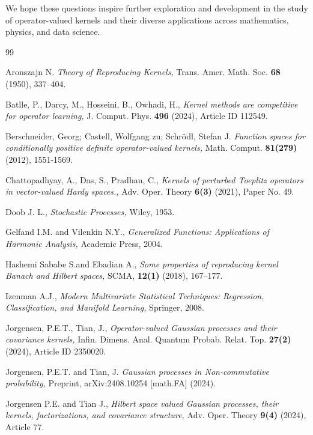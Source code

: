 \documentclass[11pt]{amsart}
\theoremstyle{definition}
\numberwithin{equation}{section}
\begin{document}
We hope these questions inspire further exploration and development in the study of operator-valued kernels and their diverse applications across mathematics, physics, and data science.


\begin{thebibliography}{99}

Aronszajn  N. {\it Theory of Reproducing Kernels,} Trans. Amer. Math. Soc. {\bf 68} (1950), 337--404.

Batlle, P., Darcy, M., Hosseini, B., Owhadi, H., {\it Kernel methods are competitive for operator learning,} J. Comput. Phys. {\bf 496} (2024), Article ID 112549.

Berschneider, Georg; Castell, Wolfgang zu; Schrödl, Stefan J. {\it Function spaces for conditionally positive definite operator-valued kernels,} Math. Comput. {\bf 81(279)} (2012), 1551-1569.

Chattopadhyay, A., Das, S., Pradhan, C., {\it Kernels of perturbed Toeplitz operators in vector-valued Hardy spaces.,} Adv. Oper. Theory {\bf 6(3)} (2021), Paper No. 49.

Doob J. L., {\it Stochastic Processes,} Wiley, 1953.

Gelfand I.M.  and Vilenkin N.Y., {\it Generalized Functions: Applications of Harmonic Analysis,} Academic Press, 2004.

Hashemi Sababe S.and Ebadian A., {\it Some properties of reproducing kernel Banach and Hilbert spaces,} SCMA, {\bf 12(1)} (2018), 167--177.

 Izenman A.J., {\it Modern Multivariate Statistical Techniques: Regression, Classification, and Manifold Learning,} Springer, 2008.

Jorgensen, P.E.T., Tian, J., {\it Operator-valued Gaussian processes and their covariance kernels,} Infin. Dimens. Anal. Quantum Probab. Relat. Top. {\bf 27(2)} (2024), Article ID 2350020.

Jorgensen, P.E.T. and Tian, J. {\it Gaussian processes in Non-commutative probability,} Preprint, arXiv:2408.10254 [math.FA] (2024).

Jorgensen P.E. and Tian J., {\it Hilbert space valued Gaussian processes, their kernels, factorizations, and covariance structure,} Adv. Oper. Theory {\bf 9(4)} (2024), Article 77.


\end{thebibliography}
\end{document}
